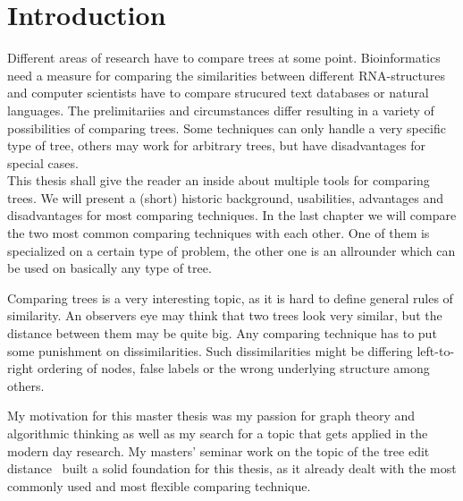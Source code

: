\chapter{Introduction}
Different areas of research have to compare trees at some point. Bioinformatics need a measure for comparing the similarities between different RNA-structures and computer scientists have to compare strucured text databases or natural languages. The prelimitariies and circumstances differ resulting in a variety of possibilities of comparing trees. Some techniques can only handle a very specific type of tree, others may work for arbitrary trees, but have disadvantages for special cases. \\
This thesis shall give the reader an inside about multiple tools for comparing trees. We will present a (short) historic background, usabilities, advantages and disadvantages for most comparing techniques. In the last chapter we will compare the two most common comparing techniques with each other. One of them is specialized on a certain type of problem, the other one is an allrounder which can be used on basically any type of tree. 

Comparing trees is a very interesting topic, as it is hard to define general rules of similarity. An observers eye may think that two trees look very similar, but the distance between them may be quite big. Any comparing technique has to put some punishment on dissimilarities. Such dissimilarities might be differing left-to-right ordering of nodes, false labels or the wrong underlying structure among others. 

My motivation for this master thesis was my passion for graph theory and algorithmic thinking as well as my search for a topic that gets applied in the modern day research.  My masters' seminar work on the topic of the tree edit distance~ built a solid foundation for this thesis, as it already dealt with the most commonly used and most flexible comparing technique. 